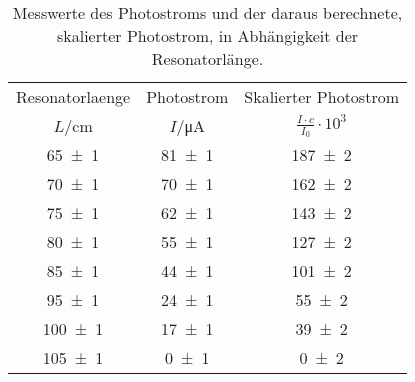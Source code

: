 \begin{table}[!h]
	\centering
	\begin{tabular}{ccc}
		\toprule
		Resonatorlaenge & Photostrom & Skalierter Photostrom\\
		$L$/\si{\centi\meter} & $I$/\si{\micro\ampere} & $\frac{I\cdot c}{I_0}\cdot 10^3$\\
\midrule
		\num{65(1)} & \num{81(1)} & \num{187(2)}\\
		\num{70(1)} & \num{70(1)} & \num{162(2)}\\
		\num{75(1)} & \num{62(1)} & \num{143(2)}\\
		\num{80(1)} & \num{55(1)} & \num{127(2)}\\
		\num{85(1)} & \num{44(1)} & \num{101(2)}\\
		\num{95(1)} & \num{24(1)} & \num{55(2)}\\
		\num{100(1)} & \num{17(1)} & \num{39(2)}\\
		\num{105(1)} & \num{0(1)} & \num{0(2)}\\
		\bottomrule
	\end{tabular}
	\caption{Messwerte des Photostroms und der daraus berechnete, skalierter Photostrom, in Abhängigkeit der Resonatorlänge. \label{tab:Stabilität}}
\end{table}
